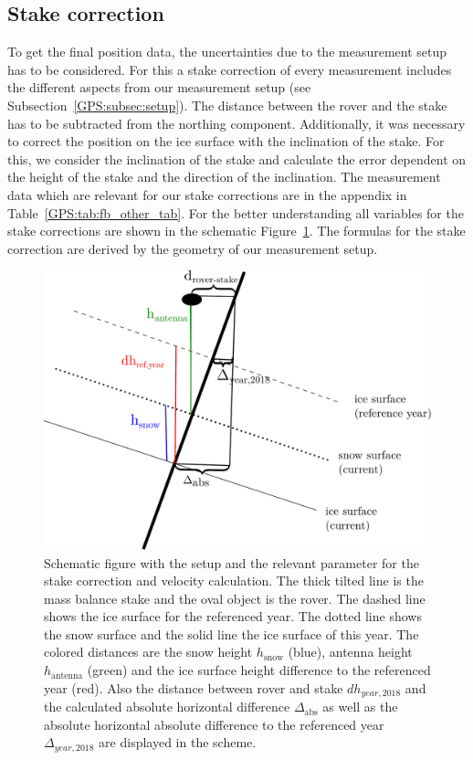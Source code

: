 \subsection{Stake correction}
To get the final position data, the uncertainties due to the measurement setup has to be considered.
For this a stake correction of every measurement includes the different aspects from our measurement setup (see Subsection~\ref{GPS:subsec:setup}).
The distance between the rover and the stake has to be subtracted from the northing component.
Additionally, it was necessary to correct the position on the ice surface with the inclination of the stake. 
For this, we consider the inclination of the stake and calculate the error dependent on the height of the stake and the direction of the inclination.
The measurement data which are relevant for our stake corrections are in the appendix in Table~\ref{GPS:tab:fb_other_tab}.
For the better understanding all variables for the stake corrections are shown in the schematic Figure~\ref{GPS:fig:scheme}.
The formulas for the stake correction are derived by the geometry of our measurement setup.

\begin{figure}[h]
	\centering
	\includegraphics[width=0.7\linewidth]{./figs/pictures/schematic_setup.pdf}
	\caption{Schematic figure with the setup and the relevant parameter for the stake correction and velocity calculation. The thick tilted line is the mass balance stake and the oval object is the rover. The dashed line shows the ice surface for the referenced year. The dotted line shows the snow surface and the solid line the ice surface of this year. The colored distances are the snow height $h_{\text{snow}}$ (blue), antenna height $h_{\text{antenna}}$ (green) and the ice surface height difference to the referenced year (red). Also the distance between rover and stake $dh_{year,2018}$ and the calculated absolute horizontal difference $\Delta_{\text{abs}}$ as well as the absolute horizontal absolute difference to the referenced year $\Delta_{year,2018}$ are displayed in the scheme.}
	\label{GPS:fig:scheme}
\end{figure}

